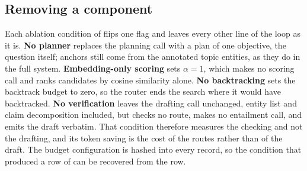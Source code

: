 \subsection{Removing a component}\label{sec:removal}

Each ablation condition of  flips one flag and
leaves every other line of the loop as it is. \textbf{No planner}
replaces the planning call with a plan of one objective, the question
itself; anchors still come from the annotated topic entities, as they do
in the full system. \textbf{Embedding-only scoring} sets $\alpha = 1$,
which makes no scoring call and ranks candidates by cosine similarity
alone. \textbf{No backtracking} sets the backtrack budget to zero, so
the router ends the search where it would have backtracked. \textbf{No
verification} leaves the drafting call unchanged, entity list and claim
decomposition included, but checks no route, makes no entailment call,
and emits the draft verbatim. That condition therefore measures the
checking and not the drafting, and its token saving is the cost of the
routes rather than of the draft. The budget configuration is hashed into
every record, so the condition that produced a row of
 can be recovered from the row.
